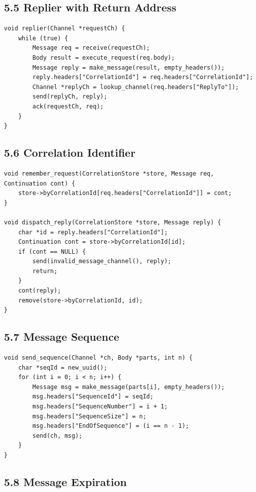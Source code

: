 \documentclass[11pt]{article}
\begin{document}
\subsection{5.5 Replier with Return
Address}\label{replier-with-return-address}

\begin{verbatim}
void replier(Channel *requestCh) {
    while (true) {
        Message req = receive(requestCh);
        Body result = execute_request(req.body);
        Message reply = make_message(result, empty_headers());
        reply.headers["CorrelationId"] = req.headers["CorrelationId"];
        Channel *replyCh = lookup_channel(req.headers["ReplyTo"]);
        send(replyCh, reply);
        ack(requestCh, req);
    }
}
\end{verbatim}

\subsection{5.6 Correlation Identifier}\label{correlation-identifier}

\begin{verbatim}
void remember_request(CorrelationStore *store, Message req, Continuation cont) {
    store->byCorrelationId[req.headers["CorrelationId"]] = cont;
}

void dispatch_reply(CorrelationStore *store, Message reply) {
    char *id = reply.headers["CorrelationId"];
    Continuation cont = store->byCorrelationId[id];
    if (cont == NULL) {
        send(invalid_message_channel(), reply);
        return;
    }
    cont(reply);
    remove(store->byCorrelationId, id);
}
\end{verbatim}

\subsection{5.7 Message Sequence}\label{message-sequence}

\begin{verbatim}
void send_sequence(Channel *ch, Body *parts, int n) {
    char *seqId = new_uuid();
    for (int i = 0; i < n; i++) {
        Message msg = make_message(parts[i], empty_headers());
        msg.headers["SequenceId"] = seqId;
        msg.headers["SequenceNumber"] = i + 1;
        msg.headers["SequenceSize"] = n;
        msg.headers["EndOfSequence"] = (i == n - 1);
        send(ch, msg);
    }
}
\end{verbatim}

\subsection{5.8 Message Expiration}\label{message-expiration}
\end{document}

